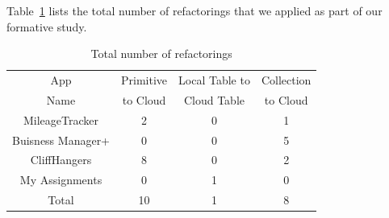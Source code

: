 \documentclass[preprint]{sigplanconf}
\begin{document}
Table~\ref{tab:refactoringsFormative} lists the total number of refactorings that we applied as part of our formative study.

\begin{table}[htdp]

\begin{center}
\begin{tabular}{|c|c|c|c|}
\hline
App  & Primitive & Local Table to   & Collection\\
 Name &  to Cloud  &  Cloud Table  & to Cloud \\
\hline
MileageTracker & 2 & 0 & 1\\
\hline
Buisness Manager+ & 0 & 0 & 5\\
\hline
CliffHangers & 8 & 0 & 2\\
\hline
My Assignments & 0 & 1 & 0\\
\hline
\hline
Total & 10 & 1  & 8 \\
\hline
\end{tabular}
\end{center}
\nocaptionrule
\caption{Total number of refactorings}
\label{tab:refactoringsFormative}
\end{table}%
\end{document}
